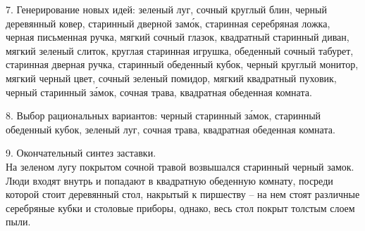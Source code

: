 7. Генерирование новых идей: зеленый луг, сочный круглый блин,
черный деревянный ковер, старинный дверной зам\'{о}к, старинная серебряная
ложка, черная письменная ручка, мягкий сочный глазок, квадратный старинный
диван, мягкий зеленый слиток, круглая старинная игрушка, обеденный сочный
табурет, старинная дверная ручка, старинный обеденный кубок, черный круглый
монитор, мягкий черный цвет, сочный зеленый помидор, мягкий квадратный пуховик,
черный старинный з\'{а}мок, сочная трава, квадратная обеденная комната.

8. Выбор рациональных вариантов: черный старинный з\'{а}мок, старинный
обеденный кубок, зеленый луг, сочная трава, квадратная обеденная комната.

9. Окончательный синтез заставки. \\
На зеленом лугу покрытом сочной травой возвышался старинный черный замок. Люди
входят внутрь и попадают в квадратную обеденную комнату, посреди которой стоит
деревянный стол, накрытый к пиршеству -- на нем стоят различные серебряные кубки
и столовые приборы, однако, весь стол покрыт толстым слоем пыли.


